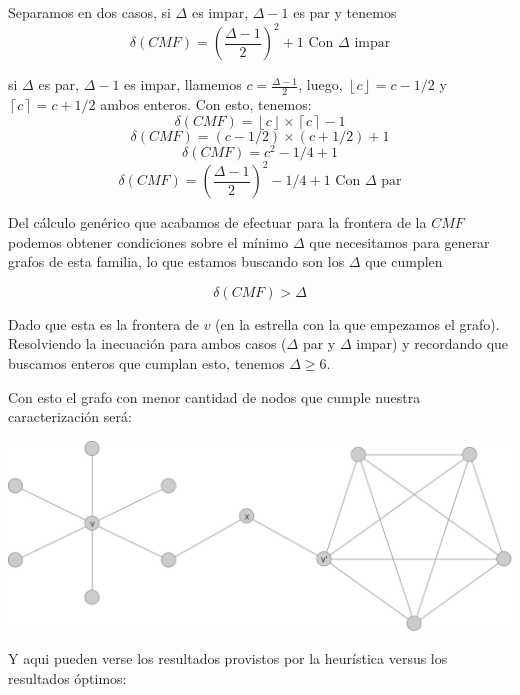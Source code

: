 Separamos en dos casos, si $\Delta$ es impar, $\Delta -1$ es par y tenemos
\[ \boxed{\delta(CMF) = (\frac{\Delta -1}{2})^2 +1} \text{ Con $\Delta$ impar} \]

si $\Delta$ es par, $\Delta -1$ es impar, llamemos $c = \frac{\Delta -1}{2}$, luego, 
$\left\lfloor c \right\rfloor = c - 1/2$ y $\left\lceil c \right\rceil = c + 1/2$ 
ambos enteros. Con esto, tenemos:
\[ \delta(CMF) = \left\lfloor c \right\rfloor \times 
	\left\lceil c \right\rceil -1 \]
\[ \delta(CMF) = (c - 1/2) \times (c + 1/2) +1 \]
\[ \delta(CMF) = c^2 - 1/4 + 1 \]
\[ \boxed{\delta(CMF) = (\frac{\Delta -1 }{2})^2 -1/4 +1} \text{ Con $\Delta$ par}\]

Del c\'alculo gen\'erico que acabamos de efectuar para la frontera de la $CMF$
podemos obtener condiciones sobre el m\'inimo $\Delta$ que necesitamos para
generar grafos de esta familia, lo que estamos buscando son los $\Delta$ que cumplen

\[ \delta(CMF) > \Delta \]

Dado que esta es la frontera de $v$ (en la estrella con la que empezamos el grafo). Resolviendo la 
inecuaci\'on para ambos casos ($\Delta$ par y $\Delta$ impar) y recordando que buscamos
enteros que cumplan esto, tenemos $\Delta \geq 6$.


Con esto el grafo con menor cantidad de nodos que cumple nuestra caracterizaci\'on ser\'a:
\begin{center} 
	\includegraphics[scale = 0.3]{img/ej3/constructiva_golosa/vnotincmf_carac1_min_st0.png} 
\end{center}

Y aqui pueden verse los resultados provistos por la heur\'istica versus los resultados \'optimos:

\phantom{x}


